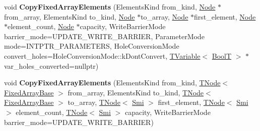 \begin{DoxyCompactItemize}
\mbox{\label{classv8_1_1internal_1_1CodeStubAssembler_aa6aa3b034223ac5de87e9c5d8d095a9a}} 
void {\bfseries Copy\+Fixed\+Array\+Elements} (Elements\+Kind from\+\_\+kind, \mbox{\hyperlink{classv8_1_1internal_1_1compiler_1_1Node}{Node}} $\ast$from\+\_\+array, Elements\+Kind to\+\_\+kind, \mbox{\hyperlink{classv8_1_1internal_1_1compiler_1_1Node}{Node}} $\ast$to\+\_\+array, \mbox{\hyperlink{classv8_1_1internal_1_1compiler_1_1Node}{Node}} $\ast$first\+\_\+element, \mbox{\hyperlink{classv8_1_1internal_1_1compiler_1_1Node}{Node}} $\ast$element\+\_\+count, \mbox{\hyperlink{classv8_1_1internal_1_1compiler_1_1Node}{Node}} $\ast$capacity, Write\+Barrier\+Mode barrier\+\_\+mode=U\+P\+D\+A\+T\+E\+\_\+\+W\+R\+I\+T\+E\+\_\+\+B\+A\+R\+R\+I\+ER, Parameter\+Mode mode=I\+N\+T\+P\+T\+R\+\_\+\+P\+A\+R\+A\+M\+E\+T\+E\+RS, Hole\+Conversion\+Mode convert\+\_\+holes=Hole\+Conversion\+Mode\+::k\+Dont\+Convert, \mbox{\hyperlink{classv8_1_1internal_1_1compiler_1_1TypedCodeAssemblerVariable}{T\+Variable}}$<$ \mbox{\hyperlink{structv8_1_1internal_1_1BoolT}{BoolT}} $>$ $\ast$var\+\_\+holes\+\_\+converted=nullptr)
\item 
\mbox{\label{classv8_1_1internal_1_1CodeStubAssembler_ac4f6c8742c969b518477931bf1b47c63}} 
void {\bfseries Copy\+Fixed\+Array\+Elements} (Elements\+Kind from\+\_\+kind, \mbox{\hyperlink{classv8_1_1internal_1_1compiler_1_1TNode}{T\+Node}}$<$ \mbox{\hyperlink{classv8_1_1internal_1_1FixedArrayBase}{Fixed\+Array\+Base}} $>$ from\+\_\+array, Elements\+Kind to\+\_\+kind, \mbox{\hyperlink{classv8_1_1internal_1_1compiler_1_1TNode}{T\+Node}}$<$ \mbox{\hyperlink{classv8_1_1internal_1_1FixedArrayBase}{Fixed\+Array\+Base}} $>$ to\+\_\+array, \mbox{\hyperlink{classv8_1_1internal_1_1compiler_1_1TNode}{T\+Node}}$<$ \mbox{\hyperlink{classv8_1_1internal_1_1Smi}{Smi}} $>$ first\+\_\+element, \mbox{\hyperlink{classv8_1_1internal_1_1compiler_1_1TNode}{T\+Node}}$<$ \mbox{\hyperlink{classv8_1_1internal_1_1Smi}{Smi}} $>$ element\+\_\+count, \mbox{\hyperlink{classv8_1_1internal_1_1compiler_1_1TNode}{T\+Node}}$<$ \mbox{\hyperlink{classv8_1_1internal_1_1Smi}{Smi}} $>$ capacity, Write\+Barrier\+Mode barrier\+\_\+mode=U\+P\+D\+A\+T\+E\+\_\+\+W\+R\+I\+T\+E\+\_\+\+B\+A\+R\+R\+I\+ER)
\item 
\mbox{\label{classv8_1_1internal_1_1CodeStubAssembler_aebcfef76104d53004e3bd263be2a3530}} 

\end{DoxyCompactItemize}
